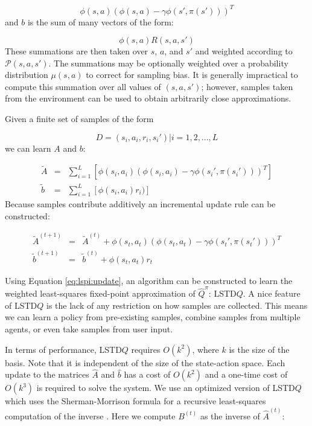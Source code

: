 \[
    \phi(s,a)(\phi(s,a) - \gamma\phi(s',\pi(s')))^T
\]
and $b$ is the sum of many vectors of the form:

\[
    \phi(s,a)R(s,a,s')
\]
These summations are then taken over $s$, $a$, and $s'$ and weighted according to $\mathcal{P}(s,a,s')$. The summations may be optionally weighted over a probability distribution $\mu(s,a)$ to correct for sampling bias. It is generally impractical to compute this summation over all values of $(s,a,s')$; however, samples taken from the environment can be used to obtain arbitrarily close approximations.

Given a finite set of samples of the form

\[
    D = { (s_i,a_i,r_i,s_i') | i = 1,2,...,L}
\]
we can learn $A$ and $b$:

\[
    \begin{array}{rcl}
        \tilde{A} &=& \displaystyle\sum_{i=1}^L[\phi(s_i,a_i)(\phi(s_i,a_i) - \gamma\phi(s_i',\pi(s_i')))^T] \\
        \tilde{b} &=& \displaystyle\sum_{i=1}^L[\phi(s_i,a_i)r_i)]
    \end{array}
\]
Because samples contribute additively an incremental update rule can be constructed:

\begin{equation}
\label{eq:lspi:update}
    \begin{array}{rcl}
        \tilde{A}^{(t+1)} &=& \tilde{A}^{(t)} + \phi(s_t,a_t)(\phi(s_t,a_t) - \gamma\phi(s_t',\pi(s_t')))^T \\
        \tilde{b}^{(t+1)} &=& \tilde{b}^{(t)} + \phi(s_t,a_t)r_t
    \end{array}
\end{equation}

Using Equation \ref{eq:lspi:update}, an algorithm can be constructed to learn the weighted least-squares fixed-point approximation of $\hat{Q}^\pi$: LSTD$Q$. A nice feature of LSTD$Q$ is the lack of any restriction on how samples are collected. This means we can learn a policy from pre-existing samples, combine samples from multiple agents, or even take samples from user input.

In terms of performance, LSTD$Q$ requires $O(k^2)$, where $k$ is the size of the basis. Note that it is independent of the size of the state-action space. Each update to the matrices $\hat{A}$ and $\hat{b}$ has a cost of $O(k^2)$ and a one-time cost of $O(k^3)$ is required to solve the system. We use an optimized version of LSTD$Q$ which uses the Sherman-Morrison formula for a recursive least-squares computation of the inverse \cite{lspi}. Here we compute $B^{(t)}$ as the inverse of $\hat{A}^{(t)}$:

